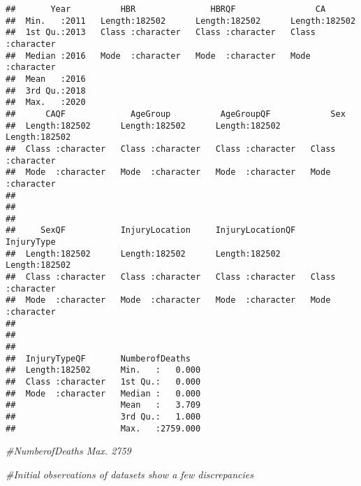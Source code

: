 \documentclass[
]{article}
\newenvironment{Shaded}{\begin{snugshade}}{\end{snugshade}}
\newcommand{\CommentTok}[1]{\textcolor[rgb]{0.56,0.35,0.01}{\textit{#1}}}
\begin{document}
\begin{verbatim}
##       Year          HBR               HBRQF                CA           
##  Min.   :2011   Length:182502      Length:182502      Length:182502     
##  1st Qu.:2013   Class :character   Class :character   Class :character  
##  Median :2016   Mode  :character   Mode  :character   Mode  :character  
##  Mean   :2016                                                           
##  3rd Qu.:2018                                                           
##  Max.   :2020                                                           
##      CAQF             AgeGroup          AgeGroupQF            Sex           
##  Length:182502      Length:182502      Length:182502      Length:182502     
##  Class :character   Class :character   Class :character   Class :character  
##  Mode  :character   Mode  :character   Mode  :character   Mode  :character  
##                                                                             
##                                                                             
##                                                                             
##     SexQF           InjuryLocation     InjuryLocationQF    InjuryType       
##  Length:182502      Length:182502      Length:182502      Length:182502     
##  Class :character   Class :character   Class :character   Class :character  
##  Mode  :character   Mode  :character   Mode  :character   Mode  :character  
##                                                                             
##                                                                             
##                                                                             
##  InjuryTypeQF       NumberofDeaths    
##  Length:182502      Min.   :   0.000  
##  Class :character   1st Qu.:   0.000  
##  Mode  :character   Median :   0.000  
##                     Mean   :   3.709  
##                     3rd Qu.:   1.000  
##                     Max.   :2759.000
\end{verbatim}

\begin{Shaded}
\begin{Highlighting}[]
\CommentTok{\#NumberofDeaths Max. 2759}

\CommentTok{\#Initial observations of datasets show a few discrepancies}
\end{Highlighting}
\end{Shaded}
\end{document}
